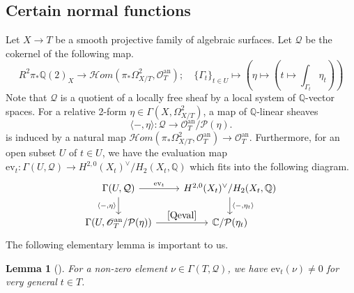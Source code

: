 \documentclass[letterpaper, 11pt]{amsart}
\theoremstyle{my theoremstyle}
\newtheorem{lem}[thm]{Lemma}
\theoremstyle{dfn}
\theoremstyle{remark}
\renewcommand{\1}{\mathbbm{1}}
\newcommand{\C}{\mathbb{C}}
\newcommand{\Q}{\mathbb{Q}}
\def\aru{{\arrow[u,"\rotatebox{90}{$\in$}",phantom]}}
\numberwithin{equation}{section}
\begin{document}
\subsection{Certain normal functions}
Let $X\to T$ be a smooth projective family of algebraic surfaces.
Let $\mathcal{Q}$ be the cokernel of the following map.
\begin{equation*}
R^{2}\pi_*\Q(2)_X\to {\mathscr Hom}(\pi_*\Omega^2_{X/T},\mathscr{O}_T^{\mathrm{an}});\quad\{\Gamma_t\}_{t\in U}\mapsto \left(\eta\mapsto \left(t\mapsto \int_{\Gamma_t}\eta_t\right)\right)
\end{equation*}
Note that $\mathcal{Q}$ is a quotient of a locally free sheaf by a local system of $\Q$-vector spaces.
For a relative 2-form $\eta\in \Gamma(X,\Omega_{X/T}^2)$, a map of $\Q$-linear sheaves
\begin{equation*}
\langle-,\eta\rangle\colon\mathcal{Q}\to \mathscr{O}_T^{\mathrm{an}}/\mathcal{P}(\eta).
\end{equation*}
is induced by a natural map ${\mathscr Hom}(\pi_*\Omega^2_{X/T},\mathscr{O}_T^{\mathrm{an}})\to \mathscr{O}_T^{\mathrm{an}}$.
Furthermore, for an open subset $U$ of $t\in U$, we have the evaluation map $\mathrm{ev}_t\colon \Gamma(U,\mathcal{Q})\to H^{2,0}(X_t)^\vee/H_2(X_t,\Q)$ which fits into the following diagram.
\begin{equation*}
\begin{tikzcd}
\Gamma(U,\mathcal{Q}) \arrow[d,"\langle -{,}\eta\rangle"'] \arrow[r,"\mathrm{ev}_t"]& H^{2,0}(X_t)^\vee/H_2(X_t,\Q) \arrow[d,"\langle -{,} \eta_t\rangle "] \\
\Gamma(U,\mathscr{O}_T^{\mathrm{an}}/\mathcal{P}(\eta)) \arrow[r,"\eqref{Qeval}"] & \C/\mathcal{P}(\eta_t) %
\end{tikzcd}
\end{equation*}
The following elementary lemma is important to us.
\begin{lem}[{\cite[Lemma 2.4]{NS}}] \label{basiclem}
For a non-zero element $\nu \in \Gamma(T,\mathcal{Q})$, we have $\mathrm{ev}_t(\nu)\neq 0$ for very general $t\in T$.
\end{lem}
\end{document}
